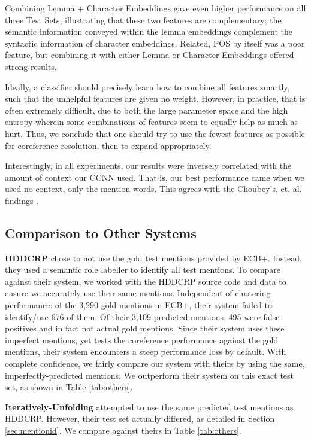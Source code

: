 \documentclass[11pt,a4paper]{article}
\begin{document}
Combining Lemma + Character Embeddings gave even higher performance on all three Test Sets, illustrating that these two features are complementary; the semantic information conveyed within the lemma embeddings complement the syntactic information of character embeddings.  Related, POS by itself was a poor feature, but combining it with either Lemma or Character Embeddings offered strong results. 

Ideally, a classifier should precisely learn how to combine all features smartly, such that the unhelpful features are given no weight.  However, in practice, that is often extremely difficult, due to both the large parameter space and the high entropy wherein some combinations of features seem to equally help as much as hurt.  Thus, we conclude that one should try to use the fewest features as possible for coreference resolution, then to expand appropriately.

Interestingly, in all experiments, our results were inversely correlated with the amount of context our CCNN used.  That is, our best performance came when we used no context, only the mention words.  This agrees with the Choubey's, et. al. findings .

\subsection{Comparison to Other Systems}
\textbf{HDDCRP} chose to not use the gold test mentions provided by ECB+.  Instead, they used a semantic role labeller to identify all test mentions.
To compare against their system, we worked with the HDDCRP source code and data to ensure we accurately use their same mentions.  Independent of clustering performance: of the 3,290 gold mentions in ECB+, their system failed to identify/use 676 of them.  Of their 3,109 predicted mentions, 495 were false positives and in fact not actual gold mentions.  Since their system uses these imperfect mentions, yet tests the coreference performance against the gold mentions, their system encounters a steep performance loss by default.  With complete confidence, we fairly compare our system with theirs by using the same, imperfectly-predicted mentions.  We outperform their system on this exact test set, as shown in Table \ref{tab:others}.

\textbf{Iteratively-Unfolding} attempted to use the same predicted test mentions as HDDCRP.  However, their test set actually differed, as detailed in Section \ref{sec:mentionid}.  We compare against theirs in Table \ref{tab:others}.
\end{document}
